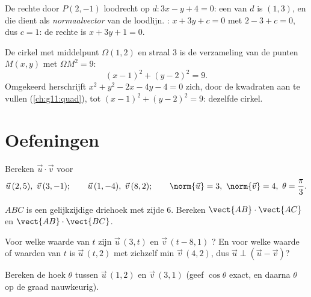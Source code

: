 \begin{example}\label{ex:g11:scal:perpline}
De rechte door $P(2, -1)$ loodrecht op $d : 3x - y + 4 = 0$: een
 van $d$ is $(1, 3)$, en die dient als \emph{normaalvector}
van de loodlijn. : $x + 3y + c = 0$ met $2 - 3 + c = 0$, dus
$c = 1$: de rechte is $x + 3y + 1 = 0$.
\end{example}

\begin{example}\label{ex:g11:scal:circle}
De cirkel met middelpunt $\Omega(1, 2)$ en straal $3$ is de verzameling van
de punten $M(x,y)$ met $\Omega M^2 = 9$:
\[
(x - 1)^2 + (y - 2)^2 = 9 .
\]
Omgekeerd herschrijft $x^2 + y^2 - 2x - 4y - 4 = 0$ zich, door de kwadraten
aan te vullen (\cref{ch:g11:quad}), tot $(x-1)^2 + (y-2)^2 = 9$: dezelfde
cirkel.
\end{example}

\section{Oefeningen}

\begin{exercise}[$\star$]\label{exo:g11:scal:1}
Bereken $\vec u \cdot \vec v$ voor
\[
\vec u\,(2, 5),\ \vec v\,(3, -1); \qquad
\vec u\,(1, -4),\ \vec v\,(8, 2); \qquad
\norm{\vec u} = 3,\ \norm{\vec v} = 4,\ \theta = \frac{\pi}{3} .
\]
\end{exercise}

\begin{exercise}[$\star$]\label{exo:g11:scal:2}
$ABC$ is een gelijkzijdige driehoek met zijde $6$. Bereken
$\vect{AB} \cdot \vect{AC}$ en $\vect{AB} \cdot \vect{BC}$.
\end{exercise}

\begin{exercise}[$\star$]\label{exo:g11:scal:3}
Voor welke waarde van $t$ zijn $\vec u\,(3, t)$ en $\vec v\,(t - 8, 1)$
? En voor welke waarde of waarden van $t$ is $\vec u\,(t, 2)$
 met zichzelf min $\vec v\,(4, 2)$, dus
$\vec u \perp (\vec u - \vec v)$?
\end{exercise}

\begin{exercise}[$\star$]\label{exo:g11:scal:4}
Bereken de hoek $\theta$ tussen $\vec u\,(1, 2)$ en $\vec v\,(3, 1)$ (geef
$\cos\theta$ exact, en daarna $\theta$ op de graad nauwkeurig).
\end{exercise}

